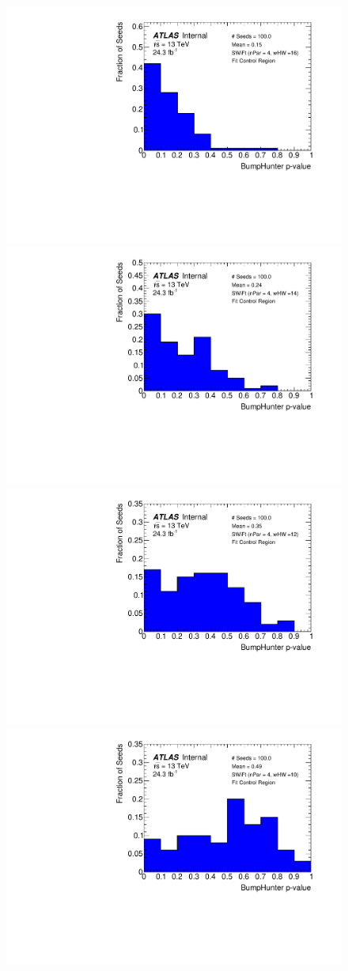 \begin{figure}[!htb]
\captionsetup[subfigure]{aboveskip=0pt,justification=centering}
\centering
{} {
  \includegraphics[width=0.3\linewidth, angle=0]{figs/Dibjet/LowMass/FitStudy_min566/pVal_bumpHunter_corrFitCR_4para_low16_high16.pdf}
}                                                                                              
 {                                                    
  \includegraphics[width=0.3\linewidth, angle=0]{figs/Dibjet/LowMass/FitStudy_min566/pVal_bumpHunter_corrFitCR_4para_low14_high14.pdf}
}                                                                                              
 {                                                    
  \includegraphics[width=0.3\linewidth, angle=0]{figs/Dibjet/LowMass/FitStudy_min566/pVal_bumpHunter_corrFitCR_4para_low12_high12.pdf}
}                                                                                              
 {                                                    
  \includegraphics[width=0.3\linewidth, angle=0]{figs/Dibjet/LowMass/FitStudy_min566/pVal_bumpHunter_corrFitCR_4para_low10_high10.pdf}
}                                                                                              

\end{figure}
